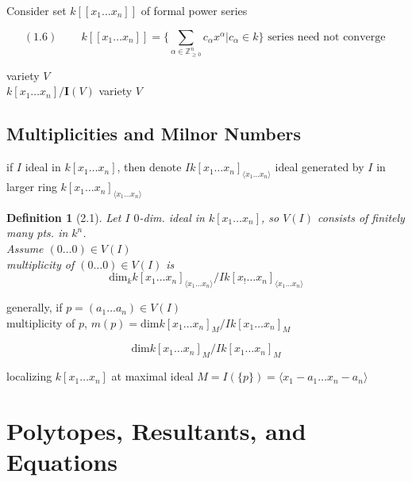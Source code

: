 \documentclass[10pt]{amsart}
\newtheorem{definition}{Definition}
\begin{document}
\begin{multicols*}{2}
Consider set $k[[x_1 \dots x_n]]$ of formal power series

\begin{equation}
  (1.6) \quad \quad \, k[[x_1 \dots x_n]] = \lbrace \sum_{\alpha \in \mathbb{Z}^n_{\geq 0}} c_{\alpha} x^{\alpha} | c_{\alpha} \in k \rbrace \text{ series need not converge }
\end{equation} 


variety $V$ \\

$k[x_1\dots x_n]/\mathbf{I}(V)$ \phantom{ \quad \quad \quad } variety $V$


\subsection{Multiplicities and Milnor Numbers}


if $I$ ideal in $k[x_1\dots x_n]$, then denote $Ik[x_1\dots x_n]_{\langle x_1 \dots x_n \rangle}$ ideal generated by $I$ in larger ring $k[x_1\dots x_n]_{\langle x_1 \dots x_n \rangle}$

\begin{definition}[2.1] Let $I$ $0$-dim. ideal in $k[x_1 \dots x_n]$, so $V(I)$ consists of finitely many pts. in $k^n$.  \\
Assume $(0 \dots 0) \in V(I)$ \\
multiplicity of $(0\dots 0)\in V(I)$ is 
\[
\text{dim}_k{ k[x_1\dots x_n]_{\langle x_1\dots x_n \rangle}} / Ik[x_!\dots x_n]_{\langle x_1 \dots x_n \rangle}
\]
\end{definition}


generally, if $p=(a_1 \dots a_n) \in V(I)$ \\
multiplicity of $p$, $m(p) = \text{dim}{ k[x_1 \dots x_n]_M } / Ik[x_1 \dots x_n]_M$

\[
\text{dim}{ k[x_1 \dots x_n]_M } / Ik[x_1 \dots x_n]_M
\]

localizing $k[x_1 \dots x_n]$ at maximal ideal $M = I(\lbrace p \rbrace) = \langle x_1 - a_1 \dots x_n-a_n \rangle$


\section{}

\section{}

\section{ Polytopes, Resultants, and Equations }


\end{multicols*}
\end{document}
